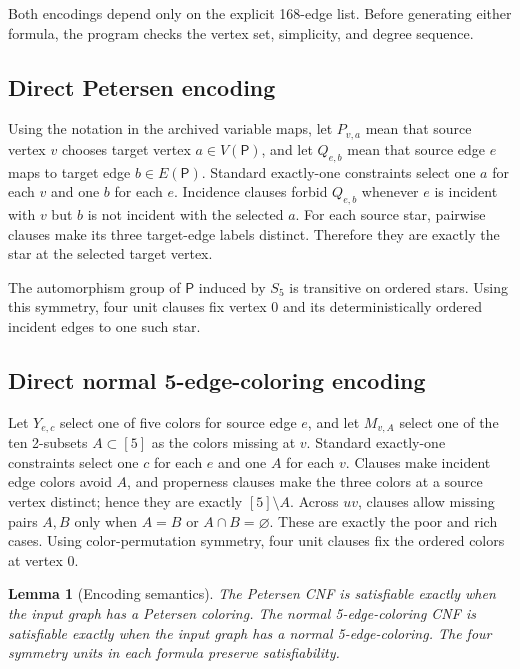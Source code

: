 \documentclass[11pt]{article}
\newtheorem{lemma}[theorem]{Lemma}
\newcommand{\Petersen}{\mathsf P}
\begin{document}
Both encodings depend only on the explicit 168-edge list.  Before generating
either formula, the program checks the vertex set, simplicity, and degree
sequence.

\subsection{Direct Petersen encoding}

Using the notation in the archived variable maps, let \(P_{v,a}\) mean that
source vertex \(v\) chooses target vertex
\(a\in V(\Petersen)\), and let \(Q_{e,b}\) mean that source edge \(e\) maps to
target edge \(b\in E(\Petersen)\).  Standard exactly-one constraints select one
\(a\) for each \(v\) and one \(b\) for each \(e\).  Incidence clauses forbid
\(Q_{e,b}\) whenever \(e\) is incident with \(v\) but \(b\) is not incident
with the selected \(a\).  For each source star, pairwise clauses make its three
target-edge labels distinct.  Therefore they are exactly the star at the
selected target vertex.

The automorphism group of \(\Petersen\) induced by \(S_5\) is transitive on
ordered stars.  Using this symmetry, four unit clauses fix vertex 0 and its
deterministically ordered incident edges to one such star.

\subsection{Direct normal 5-edge-coloring encoding}

Let \(Y_{e,c}\) select one of five colors for source edge \(e\), and let
\(M_{v,A}\) select one of the ten 2-subsets \(A\subset[5]\) as the colors
missing at \(v\).  Standard exactly-one constraints select one \(c\) for each
\(e\) and one \(A\) for each \(v\).
Clauses make incident edge colors avoid \(A\), and properness clauses make the
three colors at a source vertex distinct; hence they are exactly
\([5]\setminus A\).  Across \(uv\), clauses allow missing pairs \(A,B\) only
when \(A=B\) or \(A\cap B=\varnothing\).  These are exactly the poor and rich
cases.  Using color-permutation symmetry, four unit clauses fix the ordered
colors at vertex 0.

\begin{lemma}[Encoding semantics]\label{lem:semantics}
The Petersen CNF is satisfiable exactly when the input graph has a Petersen
coloring.  The normal 5-edge-coloring CNF is satisfiable exactly when the input
graph has a normal 5-edge-coloring.  The four symmetry units in each
formula preserve satisfiability.
\end{lemma}
\end{document}
